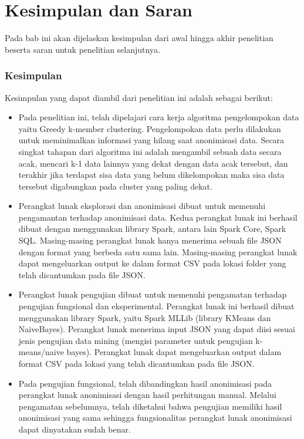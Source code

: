 \chapter{Kesimpulan dan Saran}

Pada bab ini akan dijelaskan kesimpulan dari awal hingga akhir penelitian beserta saran untuk penelitian selanjutnya. 

\subsection{Kesimpulan}

Kesimpulan yang dapat diambil dari penelitian ini adalah sebagai berikut:
\begin{itemize}

\item Pada penelitian ini, telah dipelajari cara kerja algoritma pengelompokan data yaitu Greedy k-member clustering. Pengelompokan data perlu dilakukan untuk meminimalkan informasi yang hilang saat anonimisasi data. Secara singkat tahapan dari algoritma ini adalah mengambil sebuah data secara acak, mencari k-1 data lainnya yang dekat dengan data acak tersebut, dan terakhir jika terdapat sisa data yang belum dikelompokan maka sisa data tersebut digabungkan pada cluster yang paling dekat.

\item Perangkat lunak eksplorasi dan anonimisasi dibuat untuk memenuhi pengamantan terhadap anonimisasi data. Kedua perangkat lunak ini berhasil dibuat dengan menggunakan library Spark, antara lain Spark Core, Spark SQL. Masing-masing perangkat lunak hanya menerima sebuah file JSON dengan format yang berbeda satu sama lain. Masing-masing perangkat lunak dapat mengeluarkan output ke dalam format CSV pada lokasi folder yang telah dicantumkan pada file JSON.

\item Perangkat lunak pengujian dibuat untuk memenuhi pengamatan terhadap pengujian fungsional dan eksperimental. Perangkat lunak ini berhasil dibuat menggunakan library Spark, yaitu Spark MLLib (library KMeans dan NaiveBayes). Perangkat lunak menerima input JSON yang dapat diisi sesuai jenis pengujian data mining (mengisi parameter untuk pengujian k-means/naive bayes). Perangkat lunak dapat mengeluarkan output dalam format CSV pada lokasi yang telah dicantumkan pada file JSON.

\item Pada pengujian fungsional, telah dibandingkan hasil anonimisasi pada perangkat lunak anonimisasi dengan hasil perhitungan manual. Melalui pengamatan sebelumnya, telah diketahui bahwa pengujian memiliki hasil anonimisasi yang sama sehingga fungsionalitas perangkat lunak anonimisasi dapat dinyatakan sudah benar.


\end{itemize}
